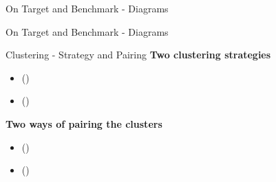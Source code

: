 
\begin{frame}{On Target and Benchmark - Diagrams} \pause
\end{frame}


\begin{frame}{On Target and Benchmark - Diagrams} 
\end{frame}


\begin{frame}{Clustering - Strategy and Pairing} \pause
    \textbf<2->{Two clustering strategies\\} 
    \begin{itemize}
        \item<3-> \fullNameClusterStrategyA{} (\nameClusterStrategyA{})
        \item<3-> \fullNameClusterStrategyB{} (\nameClusterStrategyB{})
    \end{itemize}
    \vspace{0.5cm}
    \textbf<2->{Two ways of pairing the clusters\\}
    \begin{itemize}
        \item<4-> \fullNameClusterPairingA{} (\nameClusterPairingA{})
        \item<4-> \fullNameClusterPairingB{} (\nameClusterPairingB{})
    \end{itemize}
\end{frame}


